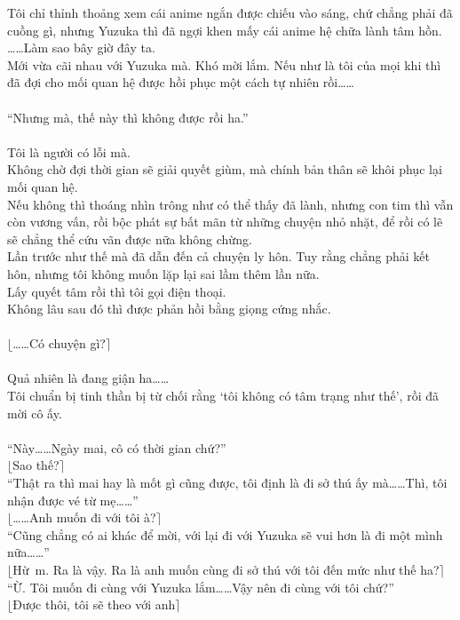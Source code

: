 \documentclass[12pt,a4paper, twosides]{book}
\begin{document}
Tôi chỉ thỉnh thoảng xem cái anime ngắn được chiếu vào sáng, chứ chẳng phải đã cuồng gì, nhưng Yuzuka thì đã ngợi khen mấy cái anime hệ chữa lành tâm hồn.\\
……Làm sao bây giờ đây ta.\\
Mới vừa cãi nhau với Yuzuka mà. Khó mời lắm. Nếu như là tôi của mọi khi thì đã đợi cho mối quan hệ được hồi phục một cách tự nhiên rồi……\\
\\
“Nhưng mà, thế này thì không được rồi ha.”\\
\\
Tôi là người có lỗi mà.\\
Không chờ đợi thời gian sẽ giải quyết giùm, mà chính bản thân sẽ khôi phục lại mối quan hệ.\\
Nếu không thì thoáng nhìn trông như có thể thấy đã lành, nhưng con tim thì vẫn còn vương vấn, rồi bộc phát sự bất mãn từ những chuyện nhỏ nhặt, để rồi có lẽ sẽ chẳng thể cứu vãn được nữa không chừng.\\
Lần trước như thế mà đã dẫn đến cả chuyện ly hôn. Tuy rằng chẳng phải kết hôn, nhưng tôi không muốn lặp lại sai lầm thêm lần nữa.\\
Lấy quyết tâm rồi thì tôi gọi điện thoại.\\
Không lâu sau đó thì được phản hồi bằng giọng cứng nhắc.\\
\\
$\lfloor$……Có chuyện gì?$\rceil$\\
\\
Quả nhiên là đang giận ha……\\
Tôi chuẩn bị tinh thần bị từ chối rằng ‘tôi không có tâm trạng như thế’, rồi đã mời cô ấy.\\
\\
“Này……Ngày mai, cô có thời gian chứ?”\\
$\lfloor$Sao thế?$\rceil$\\
“Thật ra thì mai hay là mốt gì cũng được, tôi định là đi sở thú ấy mà……Thì, tôi nhận được vé từ mẹ……”\\
$\lfloor$……Anh muốn đi với tôi à?$\rceil$\\
“Cũng chẳng có ai khác để mời, với lại đi với Yuzuka sẽ vui hơn là đi một mình nữa……”\\
$\lfloor$Hừ~m. Ra là vậy. Ra là anh muốn cùng đi sở thú với tôi đến mức như thế ha?$\rceil$\\
“Ừ. Tôi muốn đi cùng với Yuzuka lắm……Vậy nên đi cùng với tôi chứ?”\\
$\lfloor$Được thôi, tôi sẽ theo với anh$\rceil$\\
\end{document}
